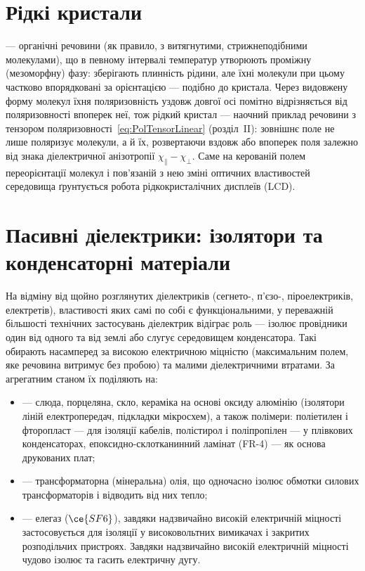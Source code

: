 \section{Рідкі кристали}\label{sec:LiquidCrystals}

 --- органічні речовини (як правило, з витягнутими, стрижнеподібними молекулами), що в певному інтервалі температур
утворюють проміжну (мезоморфну) фазу: зберігають плинність рідини, але їхні молекули при цьому частково впорядковані за орієнтацією --- подібно до
кристала. Через видовжену форму молекул їхня поляризовність уздовж довгої осі помітно відрізняється від поляризовності впоперек неї, тож рідкий
кристал --- наочний приклад речовини з  тензором поляризовності~\eqref{eq:PolTensorLinear} (розділ~II): зовнішнє поле не лише
поляризує молекули, а й  їх, розвертаючи вздовж або впоперек поля залежно від знака діелектричної анізотропії
$\chi_\parallel - \chi_\perp$. Саме на керованій полем переорієнтації молекул і пов'язаній з нею зміні оптичних властивостей середовища ґрунтується
робота рідкокристалічних дисплеїв (LCD).

\section{Пасивні діелектрики: ізолятори та конденсаторні матеріали}

На відміну від щойно розглянутих  діелектриків (сег\-не\-то-, п'єзо-, піроелектриків, електретів), властивості яких самі по собі є
функціональними, у переважній більшості технічних застосувань діелектрик відіграє  роль --- ізолює провідники один від одного та від
землі або слугує середовищем конденсатора. Такі  обирають насамперед за високою електричною міцністю (максимальним
полем, яке речовина витримує без пробою) та малими діелектричними втратами. За агрегатним станом їх поділяють на:
\begin{itemize}
	\item {} --- слюда, порцеляна, скло, кераміка на основі оксиду алюмінію (ізолятори ліній електропередач, підкладки мікросхем), а
	      також полімери: поліетилен і фторопласт --- для ізоляції кабелів, полістирол і поліпропілен --- у плівкових конденсаторах,
	      епоксидно-склотканинний ламінат (FR-4) --- як основа друкованих плат;
	\item {} --- трансформаторна (мінеральна) олія, що одночасно ізолює обмотки силових трансформаторів і відводить від них тепло;
	\item {} --- елегаз ($\ce{SF6}$), завдяки надзвичайно високій електричній міцності застосовується для ізоляції у
	      високовольтних вимикачах і закритих розподільчих пристроях. Завдяки надзвичайно високій електричній міцності чудово ізолює та гасить електричну дугу.
\end{itemize}

